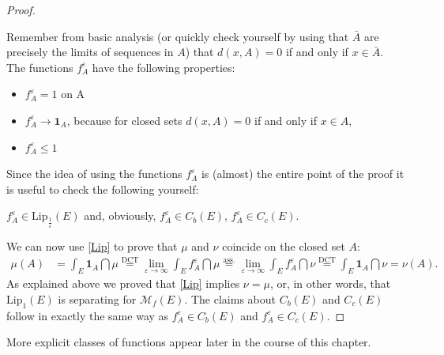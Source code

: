 \begin{proof}[Proof]
\begin{figure}[h]
\begin{center}
		\end{center}
		\vspace{-5mm}
	  \end{figure}		  
	Remember from basic analysis (or quickly check yourself by using that $\bar A$ are precisely the limits of sequences in $A$) that $d(x,A)=0$ if and only if $x\in \bar A$. The functions $f_A^\varepsilon$ have the following properties:	
			\begin{itemize}
				\item $f_A^{\varepsilon} = 1$ on A
				\item $f_A^{\varepsilon} \to \mathbf 1_A$, because for closed sets $d(x,A)=0$ if and only if $x\in A$,
				\item $f_A^{\varepsilon} \leq 1$
			\end{itemize}
			Since the idea of using the functions $f_A^\varepsilon$ is (almost) the entire point of the proof it is useful to check the following yourself:
			\begin{luebung}
				$f_A^{\varepsilon} \in \text{Lip}_{\frac{1}{\varepsilon}}(E)$ and, obviously, $f_A^{\varepsilon} \in C_b(E)$, $f_A^{\varepsilon} \in C_c(E)$.
			\end{luebung}
			We can now use \eqref{Lip} to prove that $\mu$ and $\nu$ coincide on the closed set $A$:
			\begin{align*}
				\mu (A) &= \int_E \mathbf 1_A \dint \mu 
							\overset{\text{DCT}}{=}\lim\limits_{\varepsilon \to \infty} \int_E f_A^{\varepsilon} \dint \mu 
				\overset{\text{ass.}}{=} \lim\limits_{\varepsilon \to \infty} \int_E f_A^{\varepsilon} \dint \nu 
				\overset{\text{DCT}}{=} \int_E \mathbf 1_A \dint \nu = \nu (A).
			\end{align*}
		As explained above we proved that \eqref{Lip} implies $\nu=\mu$, or, in other words, that $\text{Lip}_1(E)$ is separating for $\mathcal M_f(E)$. The claims about $C_b(E)$ and $C_c(E)$ follow in exactly the same way as $f_A^\varepsilon\in C_b(E)$ and $f_A^\varepsilon\in C_c(E)$.
\end{proof}
More explicit classes of functions appear later in the course of this chapter.

